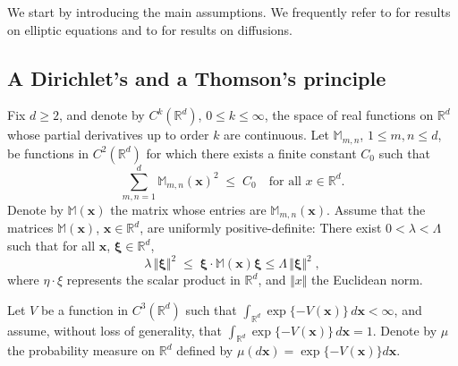 \documentclass[reqno]{amsart}
\newcounter{as}[section]
\newcommand{\bb}[1]{{\mathbb #1}}
\newcommand{\bs}[1]{{\boldsymbol #1}}
\newcommand{\<}{\langle}
\renewcommand{\>}{\rangle}
\begin{document}
We start by introducing the main assumptions. We frequently refer to
\cite{gt} for results on elliptic equations and to \cite{f, p95} for
results on diffusions.

\subsection{A Dirichlet's and a Thomson's principle}
Fix $d\ge 2$, and denote by $C^k(\bb R^d)$, $0\le k\le \infty$, the
space of real functions on $\bb R^d$ whose partial derivatives up to
order $k$ are continuous. Let $\bb M_{m,n}$, $1\le m,n\le d$, be
functions in $C^2(\bb R^d)$ for which there exists a finite constant
$C_0$ such that
\begin{equation}
\label{3-1}
\sum_{m,n=1}^d \bb M_{m,n}(\bs{x})^2 \;\le\; C_0 \quad\text{for all
  $x\in\bb R^d$.}
\end{equation}
Denote by $\bb M(\bs{x})$ the matrix whose entries are $\bb
M_{m,n}(\bs{x})$. Assume that the matrices $\bb M(\bs{x})$, $\bs x\in \bb R^d$, are
uniformly positive-definite: There exist $0<\lambda<\Lambda$ such that
for all $\bs x$, $\bs \xi\in \bb R^d$,
\begin{equation}
\label{19}
\lambda \, \Vert\bs \xi \Vert^2 \;\le\;
\bs \xi \cdot \bb M (\bs{x})\bs  \xi \le \Lambda \, \Vert\bs \xi \Vert^2\;,
\end{equation}
where $\eta\cdot \xi$ represents the scalar product in $\bb R^d$, and
$\Vert x\Vert$ the Euclidean norm.


Let $V$ be a function in $C^3(\bb R^d)$ such that $\int_{\bb R^d}
\exp\{-V(\bs{x})\}\, d\bs{x} <\infty$, and assume, without loss of generality,
that $\int_{\bb R^d} \exp\{-V(\bs{x})\}\, d\bs{x} = 1$. Denote by $\mu$ the
probability measure on $\bb R^d$ defined by $\mu(d\bs{x}) = \exp\{-V(\bs{x})\}
d\bs{x}$.
\end{document}
